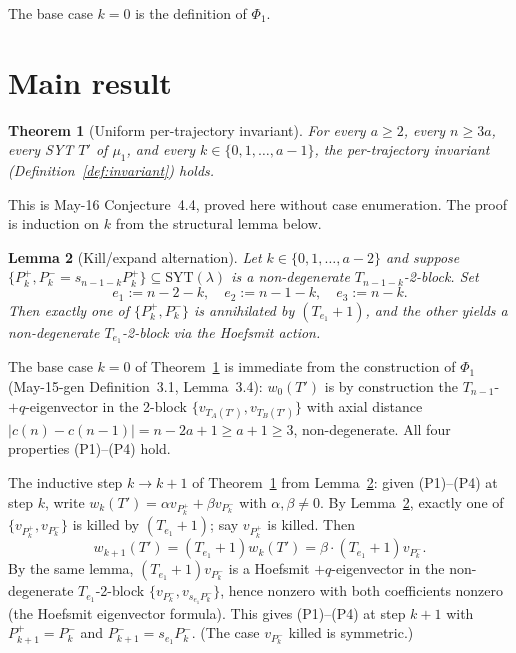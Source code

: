 \documentclass[11pt]{article}
\newtheorem{theorem}{Theorem}
\newtheorem{lemma}[theorem]{Lemma}
\theoremstyle{definition}
\begin{document}
The base case $k=0$ is the definition of $\Phi_1$.

\section{Main result}\label{sec:main}

\begin{theorem}[Uniform per-trajectory invariant]\label{thm:main}
For every $a\ge 2$, every $n\ge 3a$, every SYT $T'$ of $\mu_1$, and
every $k\in\{0,1,\ldots,a-1\}$, the per-trajectory invariant
(Definition~\ref{def:invariant}) holds.
\end{theorem}

This is May-16 Conjecture~4.4, proved here without case enumeration.
The proof is induction on $k$ from the structural lemma below.

\begin{lemma}[Kill/expand alternation]\label{lem:kill-expand}
Let $k\in\{0,1,\ldots,a-2\}$ and suppose
$\{P_k^+,P_k^-=s_{n-1-k}P_k^+\}\subseteq\mathrm{SYT}(\lambda)$ is a
non-degenerate $T_{n-1-k}$-2-block.  Set
\[
   e_1:=n-2-k,\quad e_2:=n-1-k,\quad e_3:=n-k.
\]
Then exactly one of $\{P_k^+,P_k^-\}$ is annihilated by
$(T_{e_1}{+}1)$, and the other yields a non-degenerate
$T_{e_1}$-2-block via the Hoefsmit action.
\end{lemma}

The base case $k=0$ of Theorem~\ref{thm:main} is immediate from the
construction of $\Phi_1$ (May-15-gen Definition~3.1, Lemma~3.4):
$w_0(T')$ is by construction the $T_{n-1}$-$+q$-eigenvector in the
2-block $\{v_{T_A(T')},v_{T_B(T')}\}$ with axial distance
$|c(n)-c(n-1)|=n-2a+1\ge a+1\ge 3$, non-degenerate.  All four
properties (P1)--(P4) hold.

The inductive step $k\to k+1$ of Theorem~\ref{thm:main} from
Lemma~\ref{lem:kill-expand}: given (P1)--(P4) at step $k$, write
$w_k(T')=\alpha v_{P_k^+}+\beta v_{P_k^-}$ with $\alpha,\beta\ne 0$.
By Lemma~\ref{lem:kill-expand}, exactly one of $\{v_{P_k^+},v_{P_k^-}\}$
is killed by $(T_{e_1}{+}1)$; say $v_{P_k^+}$ is killed.  Then
\[
   w_{k+1}(T')=(T_{e_1}{+}1)w_k(T')=\beta\cdot(T_{e_1}{+}1)v_{P_k^-}.
\]
By the same lemma, $(T_{e_1}{+}1)v_{P_k^-}$ is a Hoefsmit
$+q$-eigenvector in the non-degenerate $T_{e_1}$-2-block
$\{v_{P_k^-},v_{s_{e_1}P_k^-}\}$, hence nonzero with both coefficients
nonzero (the Hoefsmit eigenvector formula).  This gives
(P1)--(P4) at step $k+1$ with $P_{k+1}^+=P_k^-$ and
$P_{k+1}^-=s_{e_1}P_k^-$.  (The case $v_{P_k^-}$ killed is symmetric.)
\end{document}
